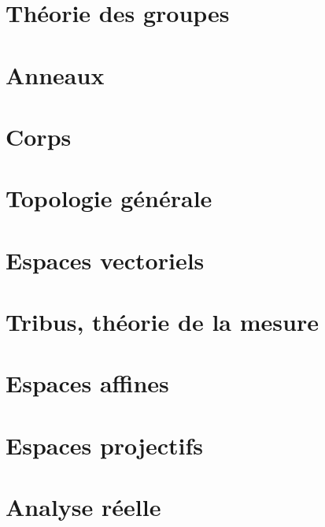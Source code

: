 \chapter{Théorie des groupes}



\chapter{Anneaux}


\chapter{Corps}






\chapter{Topologie générale}



\chapter{Espaces vectoriels}










\chapter{Tribus, théorie de la mesure}





\chapter{Espaces affines}


\chapter{Espaces projectifs}


\chapter{Analyse réelle}










